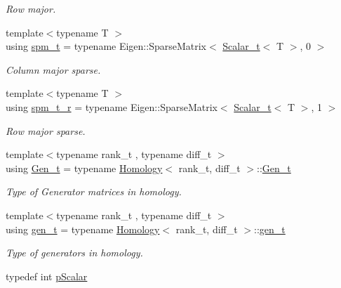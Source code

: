 \begin{DoxyCompactItemize}
\begin{DoxyCompactList}\small\item\em Row major. \end{DoxyCompactList}\item 
{\footnotesize template$<$typename T $>$ }\\using \hyperlink{namespaceMackey_a6fae5aa6894681eabd63f02c387ac618}{spm\+\_\+t} = typename Eigen\+::\+Sparse\+Matrix$<$ \hyperlink{namespaceMackey_a93ba297573961f91101fb84bc84bbe95}{Scalar\+\_\+t}$<$ T $>$, 0 $>$
\begin{DoxyCompactList}\small\item\em Column major sparse. \end{DoxyCompactList}\item 
{\footnotesize template$<$typename T $>$ }\\using \hyperlink{namespaceMackey_a43f350029dd91403df428883f202a7b6}{spm\+\_\+t\+\_\+r} = typename Eigen\+::\+Sparse\+Matrix$<$ \hyperlink{namespaceMackey_a93ba297573961f91101fb84bc84bbe95}{Scalar\+\_\+t}$<$ T $>$, 1 $>$
\begin{DoxyCompactList}\small\item\em Row major sparse. \end{DoxyCompactList}\item 
{\footnotesize template$<$typename rank\+\_\+t , typename diff\+\_\+t $>$ }\\using \hyperlink{namespaceMackey_a5048063727afe2ed842d6bff76cef28e}{Gen\+\_\+t} = typename \hyperlink{classMackey_1_1Homology}{Homology}$<$ rank\+\_\+t, diff\+\_\+t $>$\+::\hyperlink{namespaceMackey_a5048063727afe2ed842d6bff76cef28e}{Gen\+\_\+t}
\begin{DoxyCompactList}\small\item\em Type of Generator matrices in homology. \end{DoxyCompactList}\item 
{\footnotesize template$<$typename rank\+\_\+t , typename diff\+\_\+t $>$ }\\using \hyperlink{namespaceMackey_a6bb0b2796632ba6c7f8ea192f7aecffe}{gen\+\_\+t} = typename \hyperlink{classMackey_1_1Homology}{Homology}$<$ rank\+\_\+t, diff\+\_\+t $>$\+::\hyperlink{namespaceMackey_a6bb0b2796632ba6c7f8ea192f7aecffe}{gen\+\_\+t}
\begin{DoxyCompactList}\small\item\em Type of generators in homology. \end{DoxyCompactList}\item 
typedef int \hyperlink{namespaceMackey_a4f147e328c520f568f5d3adf1c75f514}{p\+Scalar}
\end{DoxyCompactItemize}
